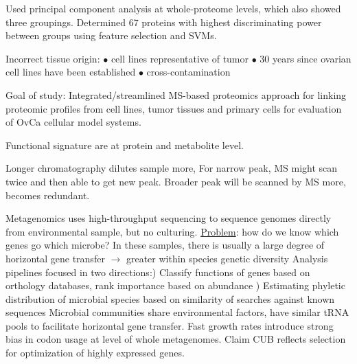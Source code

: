 \documentclass[11pt]{labbook}
\begin{document}
Used principal component analysis at whole-proteome levels, which also showed three groupings. Determined 67 proteins with highest discriminating power between groups using feature selection and SVMs. 

Incorrect tissue origin:
$\bullet$ cell lines representative of tumor \newline
$\bullet$ 30 years since ovarian cell lines have been established \newline
$\bullet$ cross-contamination 

Goal of study: Integrated/streamlined MS-based proteomics approach for linking proteomic profiles from cell lines, tumor tissues and primary cells for evaluation of OvCa cellular model systems.

Functional signature are at protein and metabolite level.

Longer chromatography dilutes sample more, For narrow peak, MS might scan twice and then able to get new peak. Broader peak will be scanned by MS more, becomes redundant. 


Metagenomics uses high-throughput sequencing to sequence genomes directly from environmental sample, but no culturing. 
\newline
\underline{Problem}: how do we know which genes go which microbe?
\newline
In these samples, there is usually a large degree of horizontal gene transfer $\rightarrow$ greater within species genetic diversity  
\newline \newline
Analysis pipelines focused in two directions:) Classify functions of genes based on orthology databases, rank importance based on abundance ) Estimating phyletic distribution of microbial species based on similarity of searches against known sequences
\newline \newline
Microbial communities share environmental factors, have similar tRNA pools to facilitate horizontal gene transfer. Fast growth rates introduce strong bias in codon usage at level of whole metagenomes. Claim CUB reflects selection for optimization of highly expressed genes. 
\end{document}
